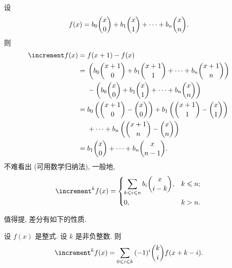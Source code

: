 \documentclass[../libro.tex]{subfiles}
\begin{document}
\begin{example}
    设
    \begin{align*}
        f(x) = b_0 \dbinom{x}{0} + b_1 \dbinom{x}{1} + \dots + b_n \dbinom{x}{n}.
    \end{align*}
    则
    \begin{align*}
        \increment f(x)
        = {} &
        f(x + 1) - f(x)
        \\
        = {} &
        \left(
            b_0 \dbinom{x+1}{0} + b_1 \dbinom{x+1}{1} + \dots + b_n \dbinom{x+1}{n}
        \right)
        \\
        & -
        \left(
            b_0 \dbinom{x}{0} + b_1 \dbinom{x}{1} + \dots + b_n \dbinom{x}{n}
        \right)
        \\
        = {} &
        b_0 \left(\dbinom{x+1}{0} - \dbinom{x}{0}\right)
        + b_1 \left(\dbinom{x+1}{1} - \dbinom{x}{1}\right)
        \\
        &
        + \dots
        + b_n \left(\dbinom{x+1}{n} - \dbinom{x}{n}\right)
        \\
        = {} &
        b_1 \dbinom{x}{0} + \dots + b_n \dbinom{x}{n-1}.
    \end{align*}
    不难看出 (可用数学归纳法), 一般地,
    \begin{equation*}
        \increment^k f(x) =
        \begin{dcases}
            \sum_{k \leq i \leq n} {b_i \dbinom{x}{i-k}},
            & k \leq n; \\
            0, & k > n.
        \end{dcases}
        \qefhere
    \end{equation*}
\end{example}

值得提, 差分有如下的性质.

\begin{theorem}
    设 \(f(x)\) 是整式.
    设 \(k\) 是非负整数.
    则
    \begin{align*}
        \increment^k f (x)
        = \sum_{0 \leq i \leq k} {(-1)^i \dbinom{k}{i} f(x + k - i)}.
    \end{align*}
\end{theorem}
\end{document}
